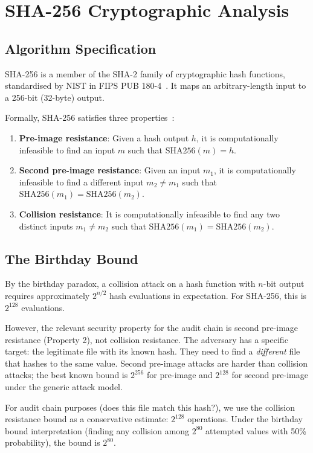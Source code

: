 \section{SHA-256 Cryptographic Analysis}
\label{sec:sha256}

\subsection{Algorithm Specification}

SHA-256 is a member of the SHA-2 family of cryptographic hash functions,
standardised by NIST in FIPS PUB 180-4~\citep{fips180}.
It maps an arbitrary-length input to a 256-bit (32-byte) output.

Formally, SHA-256 satisfies three properties~\citep{bellare2004hash}:
\begin{enumerate}
\item \textbf{Pre-image resistance}: Given a hash output $h$, it is
  computationally infeasible to find an input $m$ such that
  $\mathrm{SHA256}(m) = h$.
\item \textbf{Second pre-image resistance}: Given an input $m_1$, it is
  computationally infeasible to find a different input $m_2 \neq m_1$ such
  that $\mathrm{SHA256}(m_1) = \mathrm{SHA256}(m_2)$.
\item \textbf{Collision resistance}: It is computationally infeasible to
  find any two distinct inputs $m_1 \neq m_2$ such that
  $\mathrm{SHA256}(m_1) = \mathrm{SHA256}(m_2)$.
\end{enumerate}

\subsection{The Birthday Bound}

By the birthday paradox, a collision attack on a hash function with
$n$-bit output requires approximately $2^{n/2}$ hash evaluations in
expectation.
For SHA-256, this is $2^{128}$ evaluations.

However, the relevant security property for the audit chain is second
pre-image resistance (Property 2), not collision resistance.
The adversary has a specific target: the legitimate file with its known
hash.
They need to find a \emph{different} file that hashes to the same value.
Second pre-image attacks are harder than collision attacks; the best known
bound is $2^{256}$ for pre-image and $2^{128}$ for second pre-image
under the generic attack model.

For audit chain purposes (does this file match this hash?), we use
the collision resistance bound as a conservative estimate:
$2^{128}$ operations.
Under the birthday bound interpretation (finding any collision among
$2^{80}$ attempted values with 50\% probability), the bound is $2^{80}$.

